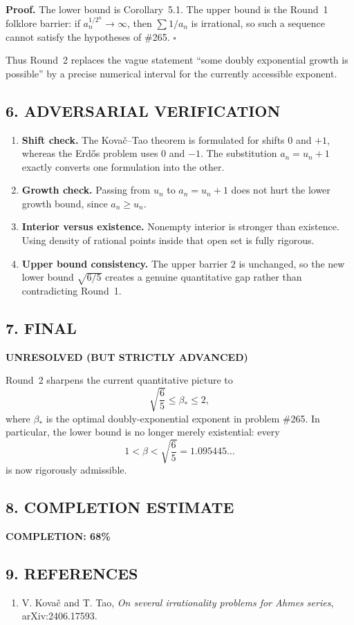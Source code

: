 \medskip
\noindent
\textbf{Proof.}
The lower bound is Corollary~5.1.  The upper bound is the Round~1 folklore barrier: if $a_n^{1/2^n}\to\infty$, then $\sum 1/a_n$ is irrational, so such a sequence cannot satisfy the hypotheses of \#265.
\hfill $\square$

\medskip
Thus Round~2 replaces the vague statement ``some doubly exponential growth is possible'' by a precise numerical interval for the currently accessible exponent.

\subsection*{6. ADVERSARIAL VERIFICATION}

\begin{enumerate}
\item \textbf{Shift check.}  The Kova\v c--Tao theorem is formulated for shifts $0$ and $+1$, whereas the Erd\H{o}s problem uses $0$ and $-1$.  The substitution $a_n=u_n+1$ exactly converts one formulation into the other.
\item \textbf{Growth check.}  Passing from $u_n$ to $a_n=u_n+1$ does not hurt the lower growth bound, since $a_n\ge u_n$.
\item \textbf{Interior versus existence.}  Nonempty interior is stronger than existence.  Using density of rational points inside that open set is fully rigorous.
\item \textbf{Upper bound consistency.}  The upper barrier $2$ is unchanged, so the new lower bound $\sqrt{6/5}$ creates a genuine quantitative gap rather than contradicting Round~1.
\end{enumerate}

\subsection*{7. FINAL}

\textbf{UNRESOLVED (BUT STRICTLY ADVANCED)}

\medskip
Round~2 sharpens the current quantitative picture to
\[
\sqrt{\frac65}\le \beta_*\le 2,
\]
where $\beta_*$ is the optimal doubly-exponential exponent in problem \#265.
In particular, the lower bound is no longer merely existential: every
\[
1<\beta<\sqrt{\frac65}=1.095445\ldots
\]
is now rigorously admissible.

\subsection*{8. COMPLETION ESTIMATE}

\textbf{COMPLETION: 68\%}

\subsection*{9. REFERENCES}

\begin{enumerate}
\item V. Kova\v c and T. Tao, \emph{On several irrationality problems for Ahmes series}, arXiv:2406.17593.
\end{enumerate}


